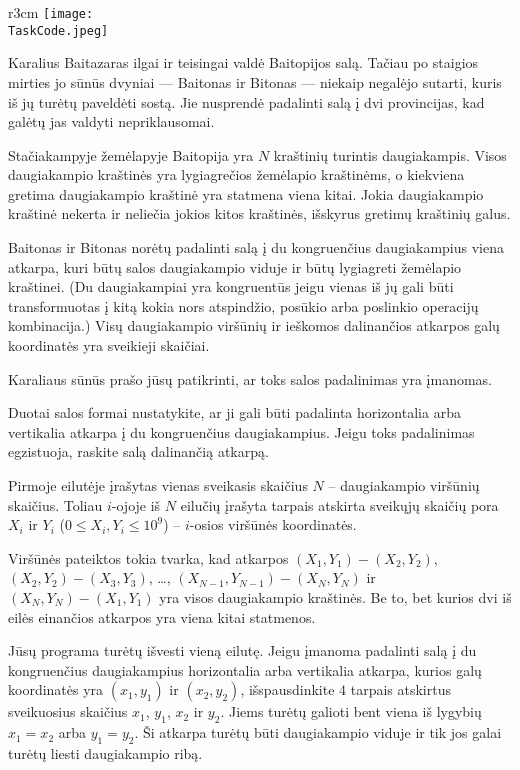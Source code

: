 \documentclass{boi2014-lt}
\renewcommand{\TaskCode}{demarcation}
\begin{document}
    \begin{wrapfigure}{r}{3cm}
        \vspace{-24pt}
		\texttt{[image: \\TaskCode.jpeg]}
	\end{wrapfigure}

    Karalius Baitazaras ilgai ir teisingai valdė Baitopijos salą. Tačiau po
    staigios mirties jo sūnūs dvyniai --- Baitonas ir Bitonas --- niekaip
    negalėjo sutarti, kuris iš jų turėtų paveldėti sostą. Jie nusprendė
    padalinti salą į dvi provincijas, kad galėtų jas valdyti nepriklausomai.
 
    Stačiakampyje žemėlapyje Baitopija yra $N$ kraštinių turintis daugiakampis.
    Visos daugiakampio kraštinės yra lygiagrečios žemėlapio kraštinėms, o
    kiekviena gretima daugiakampio kraštinė yra statmena viena kitai. Jokia
    daugiakampio kraštinė nekerta ir neliečia jokios kitos kraštinės, išskyrus
    gretimų kraštinių galus.

    Baitonas ir Bitonas norėtų padalinti salą į du kongruenčius daugiakampius
    viena atkarpa, kuri būtų salos daugiakampio viduje ir būtų lygiagreti
    žemėlapio kraštinei. (Du daugiakampiai yra kongruentūs jeigu vienas iš jų
    gali būti transformuotas į kitą kokia nors atspindžio, posūkio arba poslinkio
    operacijų kombinacija.) Visų daugiakampio viršūnių ir ieškomos dalinančios
    atkarpos galų koordinatės yra sveikieji skaičiai.
 
    Karaliaus sūnūs prašo jūsų patikrinti, ar toks salos padalinimas yra
    įmanomas.

    \Task
    Duotai salos formai nustatykite, ar ji gali būti padalinta horizontalia arba
    vertikalia atkarpa į du kongruenčius daugiakampius. Jeigu toks padalinimas
    egzistuoja, raskite salą dalinančią atkarpą.

    \Input
    Pirmoje eilutėje įrašytas vienas sveikasis skaičius $N$ -- daugiakampio
    viršūnių skaičius. Toliau $i$-ojoje iš $N$ eilučių įrašyta tarpais atskirta
    sveikųjų skaičių pora $X_i$ ir $Y_i$ ($0 \le X_i, Y_i \le 10^9$) -- $i$-osios
    viršūnės koordinatės.
    
    Viršūnės pateiktos tokia tvarka, kad atkarpos $(X_1,Y_1) - (X_2,Y_2)$,
    $(X_2,Y_2) - (X_3,Y_3)$, \ldots, $(X_{N-1},Y_{N-1}) - (X_N,Y_N)$ ir
    $(X_N,Y_N) - (X_1,Y_1)$ yra visos daugiakampio kraštinės. Be to, bet kurios
    dvi iš eilės einančios atkarpos yra viena kitai statmenos.

    \Output
    Jūsų programa turėtų išvesti vieną eilutę. Jeigu įmanoma padalinti salą į du
    kongruenčius daugiakampius horizontalia arba vertikalia atkarpa, kurios galų
    koordinatės yra $(x_1, y_1)$ ir $(x_2, y_2)$, išspausdinkite $4$ tarpais
    atskirtus sveikuosius skaičius $x_1$, $y_1$, $x_2$ ir $y_2$. Jiems turėtų
    galioti bent viena iš lygybių $x_1 = x_2$ arba $y_1 = y_2$. Ši atkarpa
    turėtų būti daugiakampio viduje ir tik jos galai turėtų liesti daugiakampio
    ribą.
\end{document}
